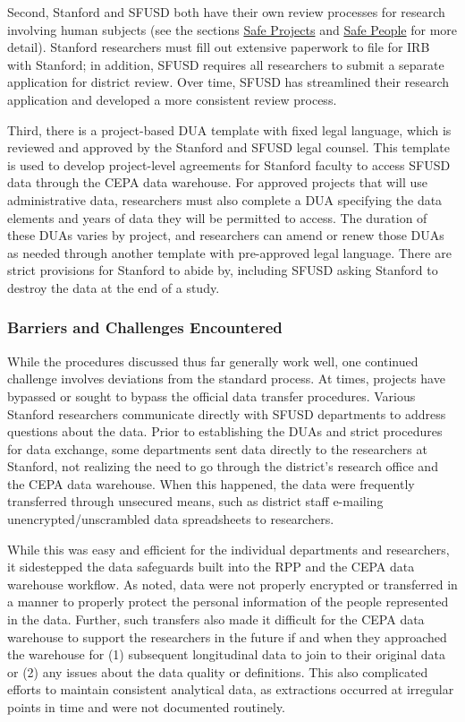 Second, Stanford and SFUSD both have their own review processes for research involving human subjects (see the sections \protect\hyperlink{safe-projects-7}{Safe Projects} and \protect\hyperlink{safe-people-7}{Safe People} for more detail). Stanford researchers must fill out extensive paperwork to file for IRB with Stanford; in addition, SFUSD requires all researchers to submit a separate application for district review. Over time, SFUSD has streamlined their research application and developed a more consistent review process.

Third, there is a project-based DUA template with fixed legal language, which is reviewed and approved by the Stanford and SFUSD legal counsel. This template is used to develop project-level agreements for Stanford faculty to access SFUSD data through the CEPA data warehouse. For approved projects that will use administrative data, researchers must also complete a DUA specifying the data elements and years of data they will be permitted to access. The duration of these DUAs varies by project, and researchers can amend or renew those DUAs as needed through another template with pre-approved legal language. There are strict provisions for Stanford to abide by, including SFUSD asking Stanford to destroy the data at the end of a study.

\hypertarget{barriers-and-challenges-encountered}{%
\subsubsection{Barriers and Challenges Encountered}\label{barriers-and-challenges-encountered}}

While the procedures discussed thus far generally work well, one continued challenge involves deviations from the standard process. At times, projects have bypassed or sought to bypass the official data transfer procedures. Various Stanford researchers communicate directly with SFUSD departments to address questions about the data. Prior to establishing the DUAs and strict procedures for data exchange, some departments sent data directly to the researchers at Stanford, not realizing the need to go through the district's research office and the CEPA data warehouse. When this happened, the data were frequently transferred through unsecured means, such as district staff e-mailing unencrypted/unscrambled data spreadsheets to researchers.

While this was easy and efficient for the individual departments and researchers, it sidestepped the data safeguards built into the RPP and the CEPA data warehouse workflow. As noted, data were not properly encrypted or transferred in a manner to properly protect the personal information of the people represented in the data. Further, such transfers also made it difficult for the CEPA data warehouse to support the researchers in the future if and when they approached the warehouse for (1) subsequent longitudinal data to join to their original data or (2) any issues about the data quality or definitions. This also complicated efforts to maintain consistent analytical data, as extractions occurred at irregular points in time and were not documented routinely.

